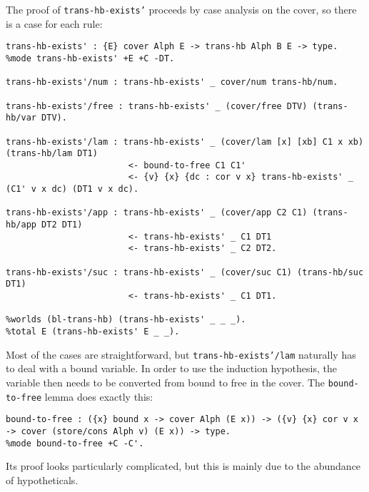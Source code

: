 The proof of \texttt{trans-hb-exists'} proceeds by case analysis on the cover, so there is a case for each rule:
\begin{verbatim}
trans-hb-exists' : {E} cover Alph E -> trans-hb Alph B E -> type.
%mode trans-hb-exists' +E +C -DT.

trans-hb-exists'/num : trans-hb-exists' _ cover/num trans-hb/num.

trans-hb-exists'/free : trans-hb-exists' _ (cover/free DTV) (trans-hb/var DTV).

trans-hb-exists'/lam : trans-hb-exists' _ (cover/lam [x] [xb] C1 x xb) (trans-hb/lam DT1)
                        <- bound-to-free C1 C1'
                        <- {v} {x} {dc : cor v x} trans-hb-exists' _ (C1' v x dc) (DT1 v x dc).

trans-hb-exists'/app : trans-hb-exists' _ (cover/app C2 C1) (trans-hb/app DT2 DT1)
                        <- trans-hb-exists' _ C1 DT1
                        <- trans-hb-exists' _ C2 DT2.

trans-hb-exists'/suc : trans-hb-exists' _ (cover/suc C1) (trans-hb/suc DT1)
                        <- trans-hb-exists' _ C1 DT1.

%worlds (bl-trans-hb) (trans-hb-exists' _ _ _).
%total E (trans-hb-exists' E _ _).
\end{verbatim}
Most of the cases are straightforward, but \texttt{trans-hb-exists'/lam} naturally has to deal with a bound variable.
In order to use the induction hypothesis, the variable then needs to be converted from bound to free in the cover.
The \texttt{bound-to-free} lemma does exactly this:
\begin{verbatim}
bound-to-free : ({x} bound x -> cover Alph (E x)) -> ({v} {x} cor v x -> cover (store/cons Alph v) (E x)) -> type.
%mode bound-to-free +C -C'.
\end{verbatim}
Its proof looks particularly complicated, but this is mainly due to the abundance of hypotheticals.
